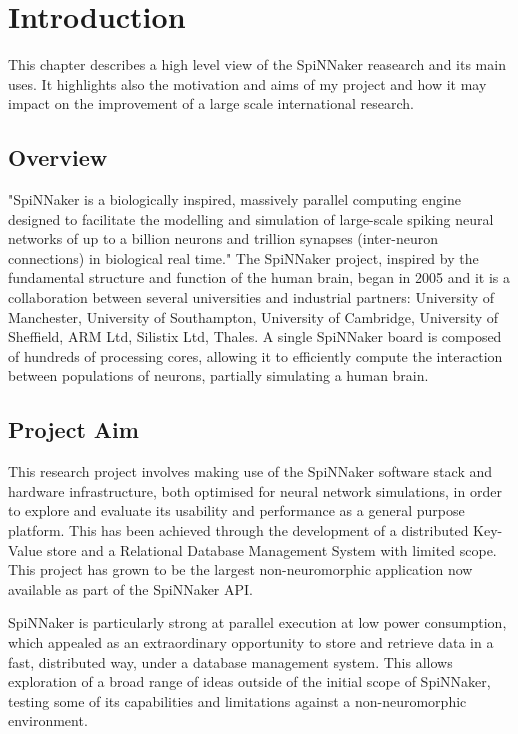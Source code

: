 \chapter{Introduction}
\label{cha:intro}

This chapter describes a high level view of the SpiNNaker reasearch and its main uses. It highlights also the motivation and aims of my project and how it may impact on the improvement of a large scale international research.

\section{Overview}
\label{sec:overview}

"SpiNNaker is a biologically inspired, massively parallel computing engine designed to facilitate the modelling and simulation of large-scale spiking neural networks of up to a billion neurons and trillion synapses (inter-neuron connections) in biological real time." \cite{painkras} The SpiNNaker project, inspired by the fundamental structure and function of the human brain, began in 2005 and it is a collaboration between several universities and industrial partners: University of Manchester, University of Southampton, University of Cambridge, University of Sheffield, ARM Ltd, Silistix Ltd, Thales. \cite{spinnproject} A single SpiNNaker board is composed of hundreds of processing cores, allowing it to efficiently compute the interaction between populations of neurons, partially simulating a human brain.

\section{Project Aim}
\label{sec:aim}

This research project involves making use of the SpiNNaker software stack and hardware infrastructure, both optimised for neural network simulations, in order to explore and evaluate its usability and performance as a general purpose platform. This has been achieved through the development of a distributed Key-Value store and a Relational Database Management System with limited scope. 
This project has grown to be the largest non-neuromorphic application now available as part of the SpiNNaker API.

SpiNNaker is particularly strong at parallel execution at low power consumption, which appealed as an extraordinary opportunity to store and retrieve data in a fast, distributed way, under a database management system. This allows exploration of a broad range of ideas outside of the initial scope of SpiNNaker, testing some of its capabilities and limitations against a non-neuromorphic environment.


